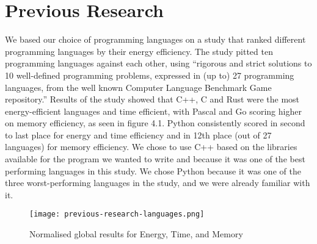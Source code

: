 \chapter{Previous Research}
We based our choice of programming languages on a study that ranked different programming languages by their energy efficiency. The study pitted ten programming languages against each other, using “rigorous and strict solutions to 10 well-defined programming problems, expressed in (up to) 27 programming languages, from the well known Computer Language Benchmark Game repository.” \cite[abstract]{PEREIRA2021102609} Results of the study showed that C++, C and Rust were the most energy-efficient languages and time efficient, with Pascal and Go scoring higher on memory efficiency, as seen in figure 4.1. Python consistently scored in second to last place for energy and time efficiency and in 12th place (out of 27 languages) for memory efficiency.
We chose to use C++ based on the libraries available for the program we wanted to write and because it was one of the best performing languages in this study.
We chose Python because it was one of the three worst-performing languages in the study, and we were already familiar with it.

\begin{figure}[htbp]
	\centering
	\texttt{[image: previous-research-languages.png]}
	\caption{Normalised global results for Energy, Time, and Memory \cite[p.16]{PEREIRA2021102609}}
	\label{figure:previous-research-languages}
\end{figure}
